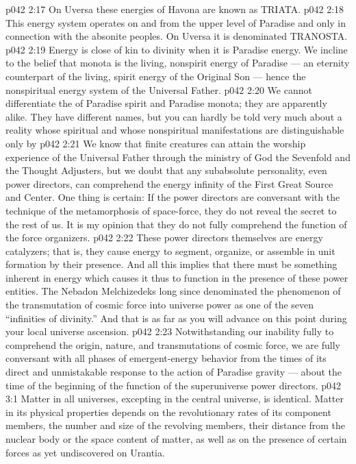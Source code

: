 \vs p042 2:17 On Uversa these energies of Havona are known as TRIATA.
\vs p042 2:18 \pc {}\bibnobreakspace {} This energy system operates on and from the upper level of Paradise and only in connection with the absonite peoples. On Uversa it is denominated TRANOSTA.
\vs p042 2:19 \pc {}\bibnobreakspace {} Energy is close of kin to divinity when it is Paradise energy. We incline to the belief that monota is the living, nonspirit energy of Paradise --- an eternity counterpart of the living, spirit energy of the Original Son --- hence the nonspiritual energy system of the Universal Father.
\vs p042 2:20 We cannot differentiate the  of Paradise spirit and Paradise monota; they are apparently alike. They have different names, but you can hardly be told very much about a reality whose spiritual and whose nonspiritual manifestations are distinguishable only by 
\vs p042 2:21 \pc We know that finite creatures can attain the worship experience of the Universal Father through the ministry of God the Sevenfold and the Thought Adjusters, but we doubt that any subabsolute personality, even power directors, can comprehend the energy infinity of the First Great Source and Center. One thing is certain: If the power directors are conversant with the technique of the metamorphosis of space\hyp{}force, they do not reveal the secret to the rest of us. It is my opinion that they do not fully comprehend the function of the force organizers.
\vs p042 2:22 These power directors themselves are energy catalyzers; that is, they cause energy to segment, organize, or assemble in unit formation by their presence. And all this implies that there must be something inherent in energy which causes it thus to function in the presence of these power entities. The Nebadon Melchizedeks long since denominated the phenomenon of the transmutation of cosmic force into universe power as one of the seven “infinities of divinity.” And that is as far as you will advance on this point during your local universe ascension.
\vs p042 2:23 \pc Notwithstanding our inability fully to comprehend the origin, nature, and transmutations of cosmic force, we are fully conversant with all phases of emergent\hyp{}energy behavior from the times of its direct and unmistakable response to the action of Paradise gravity --- about the time of the beginning of the function of the superuniverse power directors.
\vs p042 3:1 Matter in all universes, excepting in the central universe, is identical. Matter in its physical properties depends on the revolutionary rates of its component members, the number and size of the revolving members, their distance from the nuclear body or the space content of matter, as well as on the presence of certain forces as yet undiscovered on Urantia.
